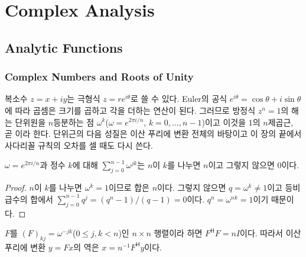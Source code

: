 \chapter{Complex Analysis}
\label{ch:complex}



\section{Analytic Functions}
\label{sec:holomorphic}

\subsection{Complex Numbers and Roots of Unity}

복소수 $z=x+iy$는 극형식 $z=re^{i\theta}$로 쓸 수 있다. Euler의 공식 $e^{i\theta}=\cos\theta+i\sin\theta$에 따라 곱셈은 크기를 곱하고 각을 더하는 연산이 된다. 그러므로 방정식 $z^n=1$의 해는 단위원을 $n$등분하는 점 $\omega^k$($\omega=e^{2\pi i/n}$, $k=0,\dots,n-1$)이고 이것을 $1$의 $n$제곱근, 곧 이라 한다. 단위근의 다음 성질은 이산 푸리에 변환 전체의 바탕이고 이 장의 끝에서 사다리꼴 규칙의 오차를 셀 때도 다시 쓴다.

\begin{proposition}
\label{prop:roots-of-unity}
$\omega=e^{2\pi i/n}$과 정수 $k$에 대해 $\sum_{j=0}^{n-1}\omega^{jk}$는 $n$이 $k$를 나누면 $n$이고 그렇지 않으면 $0$이다.
\end{proposition}

\begin{proof}
$n$이 $k$를 나누면 $\omega^k=1$이므로 합은 $n$이다. 그렇지 않으면 $q=\omega^k\ne1$이고 등비급수의 합에서 $\sum_{j=0}^{n-1}q^j=(q^n-1)/(q-1)=0$이다. $q^n=\omega^{nk}=1$이기 때문이다.
\end{proof}

\begin{corollary}[이산 직교성]
\label{cor:dft-inverse}
$F$를 $(F)_{kj}=\omega^{-jk}$($0\le j,k<n$)인 $n\times n$ 행렬이라 하면 $F^{\mathsf H}F=nI$이다. 따라서 이산 푸리에 변환 $y=Fx$의 역은 $x=n^{-1}F^{\mathsf H}y$이다.
\end{corollary}

